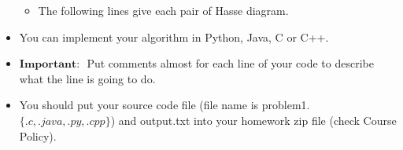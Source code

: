 \documentclass[a4 paper]{article}
\numberwithin{equation}{section}
\newcommand{\0}{\mathbf{0}}
\begin{document}
\begin{itemize}
\begin{itemize}
		\item The following lines give each pair of Hasse diagram.
	\end{itemize}	
	\item You can implement your algorithm in Python, Java, C or C++.
	\item $\textbf{Important: }$ Put comments almost for each line of your code to describe what the line is going to do. 
	\item You should put your source code file (file name is problem1.$\{.c, .java, .py, .cpp\}$) and output.txt into your homework zip file (check Course Policy).
\end{itemize}
\end{document}
